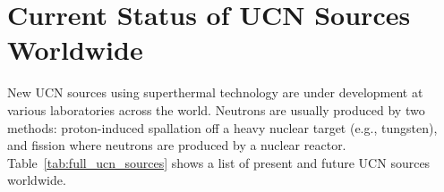 

\section{Current Status of UCN Sources Worldwide\label{sec:ucnww}}
New UCN sources using superthermal technology are under development at
various laboratories across the world. Neutrons are usually produced
by two methods: proton-induced spallation off a heavy nuclear target
(e.g., tungsten), and fission where neutrons are produced by a nuclear
reactor. Table~\ref{tab:full_ucn_sources} shows a list of present and
future UCN sources worldwide.



